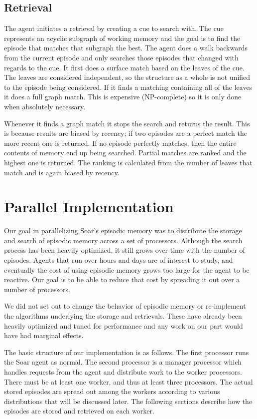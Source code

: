 \documentclass[11pt]{article} %
\begin{document}
\subsection {Retrieval}
The agent initiates a retrieval by creating a cue to search with. The cue
represents an acyclic subgraph of working memory and the goal is to find the
episode that matches that subgraph the best. The agent does a walk backwards
from the current episode and only searches those episodes that changed with
regards to the cue. It first does a surface match based on the leaves of the
cue. The leaves are considered independent, so the structure as a whole is not
unified to the episode being considered. If it finds a matching containing all
of the leaves it does a full graph match. This is expensive (NP-complete) so it
is only done when absolutely necessary.

Whenever it finds a graph match it stops the search and returns the result. This
is because results are biased by recency; if two episodes are a perfect match
the more recent one is returned. If no episode perfectly matches, then the
entire contents of memory end up being searched. Partial matches are ranked and
the highest one is returned. The ranking is calculated from the number of leaves
that match and is again biased by recency.

\section{Parallel Implementation}
Our goal in parallelizing Soar’s episodic memory was to distribute the storage
and search of episodic memory across a set of processors. Although the search
process has been heavily optimized, it still grows over time with the number of
episodes. Agents that run over hours and days are of interest to study, and
eventually the cost of using episodic memory grows too large for the agent to be
reactive. Our goal is to be able to reduce that cost by spreading it out over a
number of processors. 

We did not set out to change the behavior of episodic memory or re-implement the
algorithms underlying the storage and retrievals. These have already been
heavily optimized and tuned for performance and any work on our part would have
had marginal effects. 

The basic structure of our implementation is as follows. The first processor runs
the Soar agent as normal. The second processor is a manager processor which 
handles requests from the agent and distribute work to the worker processors. 
There must be at least one worker, and thus at least three processors. The actual
stored episodes are spread out among the workers according to various distributions
that will be discussed later. The following
sections describe how the episodes are stored and retrieved on each worker.
\end{document}
